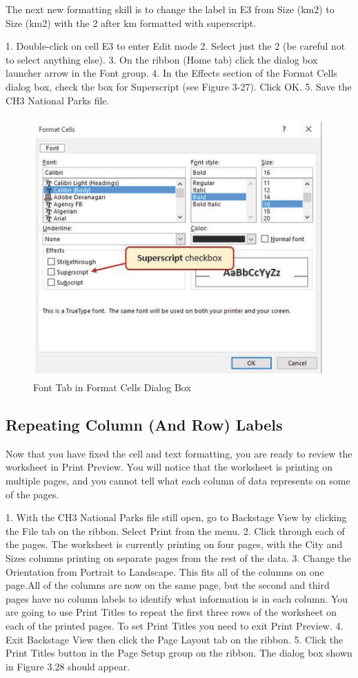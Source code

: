 The next new formatting skill is to change the label in E3 from Size (km2) to Size (km2) with the 2
after km formatted with superscript.

1. Double-click on cell E3 to enter Edit mode
2. Select just the 2 (be careful not to select anything else).
3. On the ribbon (Home tab) click the dialog box launcher arrow in the Font group.
4. In the Effects section of the Format Cells dialog box, check the box for Superscript (see Figure
3-27). Click OK.
5. Save the CH3 National Parks file.




\begin{figure}[H]
	\centering
	\includegraphics[width=\maxwidth{.95\linewidth}]{gfx/ch03_fig28}
	\caption{Font Tab in Format Cells Dialog Box}
	\label{03:fig28}
\end{figure}


\subsection{Repeating Column (And Row) Labels}

Now that you have fixed the cell and text formatting, you are ready to review the worksheet in Print
Preview. You will notice that the worksheet is printing on multiple pages, and you cannot tell what
each column of data represents on some of the pages.

1. With the CH3 National Parks file still open, go to Backstage View by clicking the File tab on the
ribbon. Select Print from the menu.
2. Click through each of the pages. The worksheet is currently printing on four pages, with the
City and Sizes columns printing on separate pages from the rest of the data.
3. Change the Orientation from Portrait to Landscape. This fits all of the columns on one page.All
of the columns are now on the same page, but the second and third pages have no column labels
to identify what information is in each column. You are going to use Print Titles to repeat the
first three rows of the worksheet on each of the printed pages. To set Print Titles you need to
exit Print Preview.
4. Exit Backstage View then click the Page Layout tab on the ribbon.
5. Click the Print Titles button in the Page Setup group on the ribbon. The dialog box shown
in Figure 3.28 should appear.


